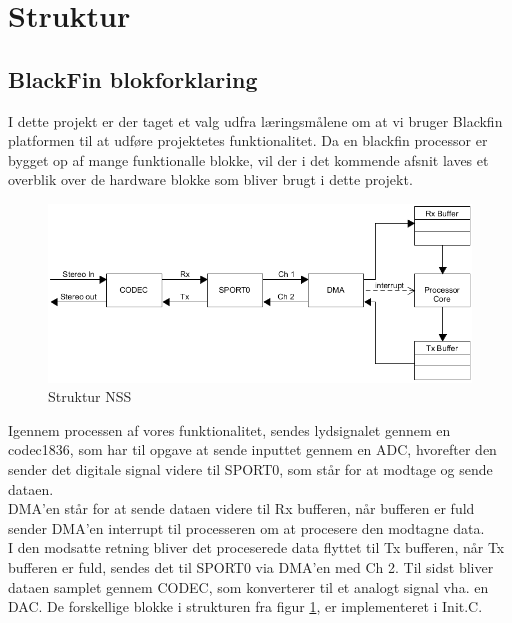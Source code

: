 \graphicspath{{Chapters/Struktur/}}

\section{Struktur}

\subsection{BlackFin blokforklaring}

I dette projekt er der taget et valg udfra læringsmålene om at vi bruger Blackfin platformen til at udføre projektetes funktionalitet. Da en blackfin processor er bygget op af mange funktionalle blokke, vil der i det kommende afsnit laves et overblik over de hardware blokke som bliver brugt i dette projekt. \cite{Struktur}

\begin{figure}[H]
	\centering
	\includegraphics[width = 400pt]{Img/Struktur}
	\caption{Struktur NSS}
	\label{fig:LMS_filter}
\end{figure}

Igennem processen af vores funktionalitet, sendes lydsignalet gennem en codec1836, som har til opgave at sende inputtet gennem en ADC, hvorefter den sender det digitale signal videre til SPORT0, som står for at modtage og sende dataen. \\

DMA'en står for at sende dataen videre til Rx bufferen, når bufferen er fuld sender DMA'en interrupt til processeren om at procesere den modtagne data. \\
I den modsatte retning bliver det proceserede data flyttet til Tx bufferen, når Tx bufferen er fuld, sendes det til SPORT0 via DMA'en med Ch 2.  
Til sidst bliver dataen samplet gennem CODEC, som konverterer til et analogt signal vha. en DAC.
De forskellige blokke i strukturen fra figur \ref{fig:LMS_filter}, er implementeret i Init.C. 
  

